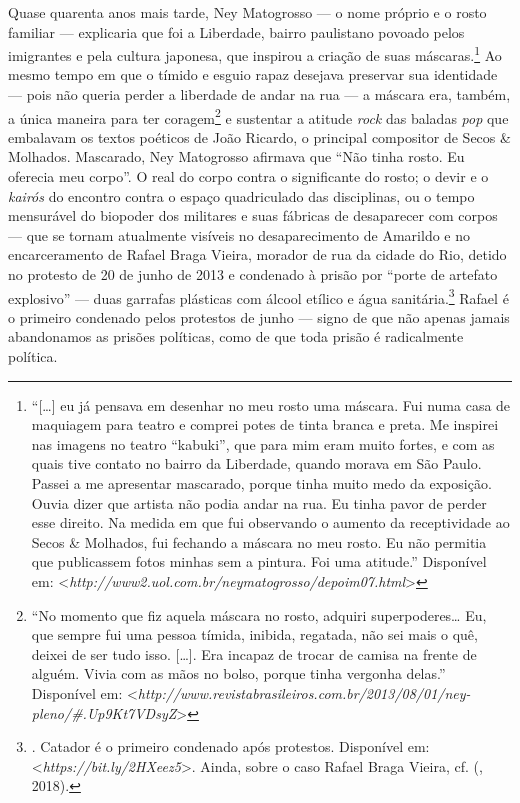 Quase quarenta anos mais tarde, Ney Matogrosso --- o nome próprio e o
rosto familiar --- explicaria que foi a Liberdade, bairro paulistano
povoado pelos imigrantes e pela cultura japonesa, que inspirou a criação
de suas máscaras.\footnote{``{[}\ldots{}{]} eu já pensava em
  desenhar no meu rosto uma máscara. Fui numa casa de maquiagem para
  teatro e comprei potes de tinta branca e preta. Me inspirei nas
  imagens no teatro ``kabuki'', que para mim eram muito fortes, e com as
  quais tive contato no bairro da Liberdade, quando morava em São Paulo.
  Passei a me apresentar mascarado, porque tinha muito medo da
  exposição. Ouvia dizer que artista não podia andar na rua. Eu tinha
  pavor de perder esse direito. Na medida em que fui observando o
  aumento da receptividade ao Secos \& Molhados, fui fechando a máscara
  no meu rosto. Eu não permitia que publicassem fotos minhas sem a
  pintura. Foi uma atitude.'' Disponível em:
  \textless{}\emph{http://www2.uol.com.br/neymatogrosso/depoim07.html}\textgreater{}}
Ao mesmo tempo em que o tímido e esguio rapaz desejava preservar sua
identidade --- pois não queria perder a liberdade de andar na rua --- a
máscara era, também, a única maneira para ter
coragem\footnote{``No momento que fiz aquela máscara no
  rosto, adquiri superpoderes\ldots{} Eu, que sempre fui uma pessoa
  tímida, inibida, regatada, não sei mais o quê, deixei de ser tudo
  isso. {[}\ldots{}{]}. Era incapaz de trocar de camisa na frente de
  alguém. Vivia com as mãos no bolso, porque tinha vergonha delas.''
  Disponível em:
  \textless{}\emph{http://www.revistabrasileiros.com.br/2013/08/01/ney-pleno/\#.Up9Kt7VDsyZ}\textgreater{}}
e sustentar a atitude \emph{rock} das baladas \emph{pop }que embalavam
os textos poéticos de João Ricardo, o principal compositor de Secos \&
Molhados. Mascarado, Ney Matogrosso afirmava que ``Não tinha rosto. Eu
oferecia meu corpo''. O real do corpo contra o significante do rosto; o
devir e o \emph{kairós} do encontro contra o espaço quadriculado das
disciplinas, ou o tempo mensurável do biopoder dos militares e suas
fábricas de desaparecer com corpos --- que se tornam atualmente visíveis
no desaparecimento de Amarildo e no encarceramento de Rafael Braga
Vieira, morador de rua da cidade do Rio, detido no protesto de 20 de
junho de 2013 e condenado à prisão por ``porte de artefato explosivo''
--- duas garrafas plásticas com álcool etílico e água
sanitária.\footnote{. Catador é o
  primeiro condenado após protestos. Disponível em:
  \textless{}\emph{https://bit.ly/2HXeez5}\textgreater{}.
  Ainda, sobre o caso Rafael Braga Vieira, cf. (, 2018).} Rafael
é o primeiro condenado pelos protestos de junho --- signo de que não
apenas jamais abandonamos as prisões políticas, como de que toda prisão
é radicalmente política.

